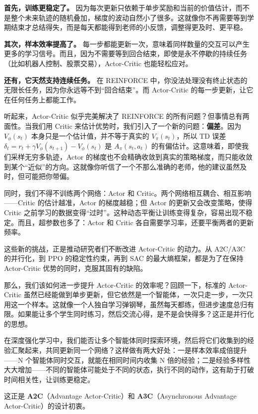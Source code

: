 \documentclass[lang=cn,zihao=-4,a4paper,fontset=windows]{beautybook}
\begin{document}
\textbf{首先，训练更稳定了。} 因为每次更新只依赖于单步奖励和当前的价值估计，而不是整个未来轨迹的随机叠加，梯度的波动自然小了很多。这就像你不再需要等到学期结束才总结得失，而是每天都能得到老师的小反馈，调整得更及时、更平稳。

\textbf{其次，样本效率提高了。} 每一步都能更新一次，意味着同样数量的交互可以产生更多的学习信号。而且，因为不需要等到回合结束，即使是永不停歇的持续任务（比如机器人控制、股票交易），Actor-Critic 也能轻松应对。

\textbf{还有，它天然支持连续任务。} 在 REINFORCE 中，你没法处理没有终止状态的无限长任务，因为你永远等不到“回合结束”。而 Actor-Critic 的每一步更新，让它在任何任务上都能工作。

听起来，Actor-Critic 似乎完美解决了 REINFORCE 的所有问题？但事情总有两面性。当我们用 Critic 来估计优势时，我们引入了一个新的问题：\textbf{偏差}。因为 \(V_\phi(s_t)\) 本身只是一个估计值，并不等于真实的 \(V_\pi(s_t)\)，所以 TD 误差 \(\delta_t = r_t + \gamma V_\phi(s_{t+1}) - V_\phi(s_t)\) 是 \(A_\pi(s_t,a_t)\) 的有偏估计。这意味着，即使我们采样无穷多轨迹，Actor 的梯度也不会精确收敛到真实的策略梯度，而只能收敛到某个“近似”的方向。这就像你听信了一个不那么准确的老师，他的建议虽然及时，但可能把你带偏。

同时，我们不得不训练两个网络：Actor 和 Critic。两个网络相互耦合、相互影响——Critic 的估计越准，Actor 的梯度越稳；但 Actor 的更新又会改变策略，使得 Critic 之前学习的数据变得“过时”。这种动态平衡让训练变得复杂，容易出现不稳定。而且，超参数也多了：Actor 和 Critic 各自需要学习率，还要平衡两者的更新频率。

这些新的挑战，正是推动研究者们不断改进 Actor-Critic 的动力。从 A2C/A3C 的并行化，到 PPO 的稳定性约束，再到 SAC 的最大熵框架，都是为了在保持 Actor-Critic 优势的同时，克服其固有的缺陷。

那么，我们该如何进一步提升 Actor-Critic 的效率呢？回顾一下，标准的 Actor-Critic 虽然已经能做到单步更新，但它依然是一个智能体，一次只走一步，一次只用这一个样本。这就像一个人独自学习弹钢琴，虽然每天都练，但进步速度总归有限。如果能让多个学生同时练习，然后交流心得，是不是会快得多？这正是并行化的思想。

在深度强化学习中，我们能否让多个智能体同时探索环境，然后将它们收集到的经验汇聚起来，共同更新同一个网络？这样做有两大好处：一是样本效率成倍提升——N 个智能体同时交互，就能在相同时间内收集 N 倍的经验；二是经验多样性大大增加——不同的智能体可能处于不同的状态，执行不同的动作，这有助于打破时间相关性，让训练更稳定。

这正是 \textbf{A2C}（Advantage Actor-Critic）和 \textbf{A3C}（Asynchronous Advantage Actor-Critic）的设计初衷。
\end{document}
